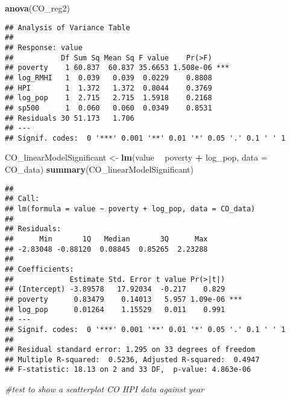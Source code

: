 \documentclass[
]{article}
\newenvironment{Shaded}{\begin{snugshade}}{\end{snugshade}}
\newcommand{\CommentTok}[1]{\textcolor[rgb]{0.56,0.35,0.01}{\textit{#1}}}
\newcommand{\DataTypeTok}[1]{\textcolor[rgb]{0.13,0.29,0.53}{#1}}
\newcommand{\KeywordTok}[1]{\textcolor[rgb]{0.13,0.29,0.53}{\textbf{#1}}}
\newcommand{\NormalTok}[1]{#1}
\newcommand{\OperatorTok}[1]{\textcolor[rgb]{0.81,0.36,0.00}{\textbf{#1}}}
\newcommand{\StringTok}[1]{\textcolor[rgb]{0.31,0.60,0.02}{#1}}
\begin{document}
\begin{Shaded}
\begin{Highlighting}[]
\KeywordTok{anova}\NormalTok{(CO_reg2)}
\end{Highlighting}
\end{Shaded}

\begin{verbatim}
## Analysis of Variance Table
## 
## Response: value
##           Df Sum Sq Mean Sq F value    Pr(>F)    
## poverty    1 60.837  60.837 35.6653 1.508e-06 ***
## log_RMHI   1  0.039   0.039  0.0229    0.8808    
## HPI        1  1.372   1.372  0.8044    0.3769    
## log_pop    1  2.715   2.715  1.5918    0.2168    
## sp500      1  0.060   0.060  0.0349    0.8531    
## Residuals 30 51.173   1.706                      
## ---
## Signif. codes:  0 '***' 0.001 '**' 0.01 '*' 0.05 '.' 0.1 ' ' 1
\end{verbatim}

\begin{Shaded}
\begin{Highlighting}[]
\NormalTok{CO_linearModelSignificant <-}\StringTok{ }\KeywordTok{lm}\NormalTok{(value }\OperatorTok{~}\StringTok{ }\NormalTok{poverty }\OperatorTok{+}\StringTok{ }\NormalTok{log_pop, }\DataTypeTok{data =}\NormalTok{ CO_data)}
\KeywordTok{summary}\NormalTok{(CO_linearModelSignificant)}
\end{Highlighting}
\end{Shaded}

\begin{verbatim}
## 
## Call:
## lm(formula = value ~ poverty + log_pop, data = CO_data)
## 
## Residuals:
##      Min       1Q   Median       3Q      Max 
## -2.83048 -0.88120  0.08845  0.85265  2.23288 
## 
## Coefficients:
##             Estimate Std. Error t value Pr(>|t|)    
## (Intercept) -3.89578   17.92034  -0.217    0.829    
## poverty      0.83479    0.14013   5.957 1.09e-06 ***
## log_pop      0.01264    1.15529   0.011    0.991    
## ---
## Signif. codes:  0 '***' 0.001 '**' 0.01 '*' 0.05 '.' 0.1 ' ' 1
## 
## Residual standard error: 1.295 on 33 degrees of freedom
## Multiple R-squared:  0.5236, Adjusted R-squared:  0.4947 
## F-statistic: 18.13 on 2 and 33 DF,  p-value: 4.863e-06
\end{verbatim}

\begin{Shaded}
\begin{Highlighting}[]
\CommentTok{#test to show a scatterplot CO HPI data against year}
\end{Highlighting}
\end{Shaded}
\end{document}

